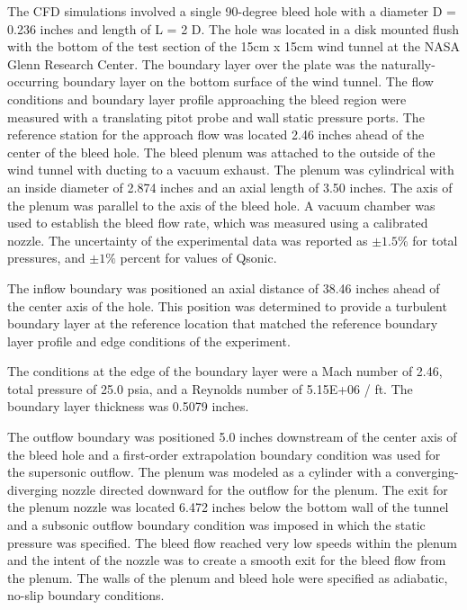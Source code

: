 The CFD simulations involved a single 90-degree bleed hole with a diameter D = 0.236 inches and length of L = 2 D. The hole was located in a disk mounted flush with the bottom of the test section of the 15cm x 15cm wind tunnel at the NASA Glenn Research Center. The boundary layer over the plate was the naturally-occurring boundary layer on the bottom surface of the wind tunnel. The flow conditions and boundary layer profile approaching the bleed region were measured with a translating pitot probe and wall static pressure ports. The reference station for the approach flow was located 2.46 inches ahead of the center of the bleed hole. The bleed plenum was attached to the outside of the wind tunnel with ducting to a vacuum exhaust. The plenum was cylindrical with an inside diameter of 2.874 inches and an axial length of 3.50 inches. The axis of the plenum was parallel to the axis of the bleed hole. A vacuum chamber was used to establish the bleed flow rate, which was measured using a calibrated nozzle. The uncertainty of the experimental data was reported as $\pm1.5 \%$ for total pressures, and $\pm 1 \%$ percent for values of Qsonic. 


The inflow boundary was positioned an axial distance of 38.46 inches ahead of the center axis of the hole. This position was determined to provide a turbulent boundary layer at the reference location that matched the reference boundary layer profile and edge conditions of the experiment. 

The  conditions at the edge of the boundary layer were a Mach number of 2.46, total pressure of 25.0 psia, and a Reynolds number of 5.15E+06 / ft. The boundary layer thickness was 0.5079 inches. 

The outflow boundary was positioned 5.0 inches downstream of the center axis of the bleed hole and a first-order extrapolation boundary condition was used for the supersonic outflow. The plenum was modeled as a cylinder with a converging-diverging nozzle directed downward for the outflow for the plenum. The exit for the plenum nozzle was located 6.472 inches below the bottom wall of the tunnel and a subsonic outflow boundary condition was imposed in which the static pressure was specified. The bleed flow reached very low speeds within the plenum and the intent of the nozzle was to create a smooth exit for the bleed flow from the plenum. The walls of the plenum and bleed hole were specified as adiabatic, no-slip boundary conditions.

